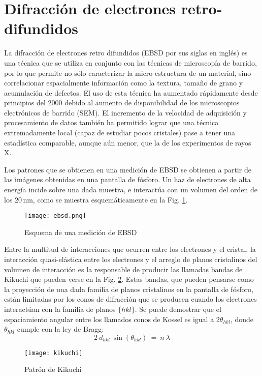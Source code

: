  \section{Difracción de electrones retro-difundidos}\label{S:EBSD}
La difracción de electrones retro difundidos (EBSD por sus siglas en inglés) es una técnica que se utiliza en conjunto con las técnicas de microscopía de barrido, por lo que permite no sólo caracterizar la micro-estructura de un material, sino correlacionar espacialmente información como la textura, tamaño de grano y acumulación de defectos.
El uso de esta técnica ha aumentado rápidamente desde principios del 2000 debido al aumento de disponibilidad de los microscopios electrónicos de barrido (SEM). El incremento de la velocidad de adquisición y procesamiento de datos también ha permitido lograr que una técnica extremadamente local (capaz de estudiar pocos cristales) pase a tener una estadística comparable, aunque aún menor, que la de los experimentos de rayos X.


Los patrones que se obtienen en una medición de EBSD se obtienen a partir de las imágenes obtenidas en una pantalla de fósforo. Un haz de electrones de alta energía incide sobre una dada muestra, e interactúa con un volumen del orden de los 20\,nm, como se muestra esquemáticamente en la Fig. \ref{fig:ebsd}.

\begin{figure}[!htb]
  \centering
  \texttt{[image: ebsd.png]}
  \caption{Esquema de una medición de EBSD}
  \label{fig:ebsd}
\end{figure}

Entre la multitud de interacciones que ocurren entre los electrones y el cristal, la interacción quasi-elástica entre los electrones y el arreglo de planos cristalinos del volumen de interacción es la responsable de producir las llamadas bandas de Kikuchi que pueden verse en la Fig. \ref{fig:kikuchi}.
Estas bandas, que pueden pensarse como la proyección de una dada familia de planos cristalinos en la pantalla de fósforo, están limitadas por los conos de difracción que se producen cuando los electrones interactúan con la familia de planos $\{ hkl \}$. 
Se puede demostrar que el espaciamiento angular entre los llamados conos de Kossel es igual a 2$\theta_{hkl}$, donde $\theta_{hkl}$ cumple con la ley de Bragg\cite{schwartz2010electron}:
\begin{equation}
  2 \ d_{hkl} \ \sin(\theta_{hkl}) \ = \ n \ \lambda
  \label{eq:BraggEBSD}
\end{equation}
\noindent
\begin{figure}[!htb]
  \centering
  \texttt{[image: kikuchi]}
  \caption{Patrón de Kikuchi}
  \label{fig:kikuchi}
 \end{figure}

